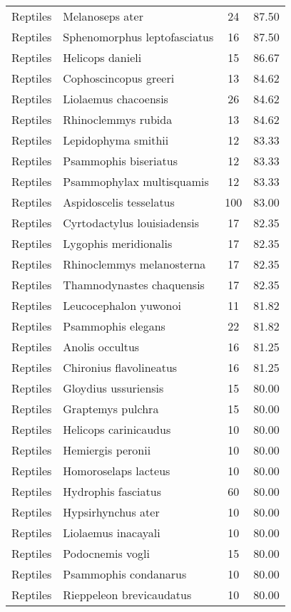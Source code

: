 \begin{longtable}{llcc}
  Reptiles & Melanoseps ater &  24 & 87.50 \\ 
  Reptiles & Sphenomorphus leptofasciatus &  16 & 87.50 \\ 
  Reptiles & Helicops danieli &  15 & 86.67 \\ 
  Reptiles & Cophoscincopus greeri &  13 & 84.62 \\ 
  Reptiles & Liolaemus chacoensis &  26 & 84.62 \\ 
  Reptiles & Rhinoclemmys rubida &  13 & 84.62 \\ 
  Reptiles & Lepidophyma smithii &  12 & 83.33 \\ 
  Reptiles & Psammophis biseriatus &  12 & 83.33 \\ 
  Reptiles & Psammophylax multisquamis &  12 & 83.33 \\ 
  Reptiles & Aspidoscelis tesselatus & 100 & 83.00 \\ 
  Reptiles & Cyrtodactylus louisiadensis &  17 & 82.35 \\ 
  Reptiles & Lygophis meridionalis &  17 & 82.35 \\ 
  Reptiles & Rhinoclemmys melanosterna &  17 & 82.35 \\ 
  Reptiles & Thamnodynastes chaquensis &  17 & 82.35 \\ 
  Reptiles & Leucocephalon yuwonoi &  11 & 81.82 \\ 
  Reptiles & Psammophis elegans &  22 & 81.82 \\ 
  Reptiles & Anolis occultus &  16 & 81.25 \\ 
  Reptiles & Chironius flavolineatus &  16 & 81.25 \\ 
  Reptiles & Gloydius ussuriensis &  15 & 80.00 \\ 
  Reptiles & Graptemys pulchra &  15 & 80.00 \\ 
  Reptiles & Helicops carinicaudus &  10 & 80.00 \\ 
  Reptiles & Hemiergis peronii &  10 & 80.00 \\ 
  Reptiles & Homoroselaps lacteus &  10 & 80.00 \\ 
  Reptiles & Hydrophis fasciatus &  60 & 80.00 \\ 
  Reptiles & Hypsirhynchus ater &  10 & 80.00 \\ 
  Reptiles & Liolaemus inacayali &  10 & 80.00 \\ 
  Reptiles & Podocnemis vogli &  15 & 80.00 \\ 
  Reptiles & Psammophis condanarus &  10 & 80.00 \\ 
  Reptiles & Rieppeleon brevicaudatus &  10 & 80.00 \\ 

\end{longtable}
